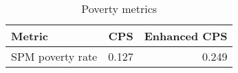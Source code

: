 \begin{table}[h]
    \centering
    \caption{Poverty metrics}
    \label{tab:poverty_metrics}
    \begin{tabular}{lrr}
    \toprule
    Metric & CPS & Enhanced CPS \\
    \midrule
    SPM poverty rate & 0.127 & 0.249 \\
    \bottomrule
    \end{tabular}
\end{table}
